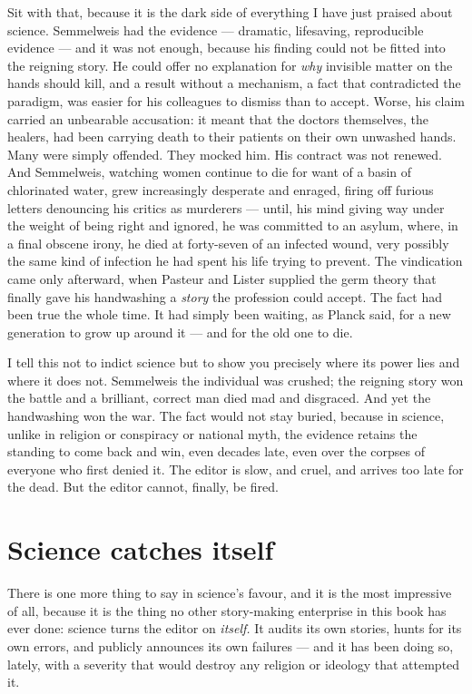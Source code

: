 Sit with that, because it is the dark side of everything I have just praised about science. Semmelweis had the evidence — dramatic, lifesaving, reproducible evidence — and it was not enough, because his finding could not be fitted into the reigning story. He could offer no explanation for \emph{why} invisible matter on the hands should kill, and a result without a mechanism, a fact that contradicted the paradigm, was easier for his colleagues to dismiss than to accept. Worse, his claim carried an unbearable accusation: it meant that the doctors themselves, the healers, had been carrying death to their patients on their own unwashed hands. Many were simply offended. They mocked him. His contract was not renewed. And Semmelweis, watching women continue to die for want of a basin of chlorinated water, grew increasingly desperate and enraged, firing off furious letters denouncing his critics as murderers — until, his mind giving way under the weight of being right and ignored, he was committed to an asylum, where, in a final obscene irony, he died at forty-seven of an infected wound, very possibly the same kind of infection he had spent his life trying to prevent. The vindication came only afterward, when Pasteur and Lister supplied the germ theory that finally gave his handwashing a \emph{story} the profession could accept. The fact had been true the whole time. It had simply been waiting, as Planck said, for a new generation to grow up around it — and for the old one to die.

I tell this not to indict science but to show you precisely where its power lies and where it does not. Semmelweis the individual was crushed; the reigning story won the battle and a brilliant, correct man died mad and disgraced. And yet the handwashing won the war. The fact would not stay buried, because in science, unlike in religion or conspiracy or national myth, the evidence retains the standing to come back and win, even decades late, even over the corpses of everyone who first denied it. The editor is slow, and cruel, and arrives too late for the dead. But the editor cannot, finally, be fired.

\section*{Science catches itself}

There is one more thing to say in science's favour, and it is the most impressive of all, because it is the thing no other story-making enterprise in this book has ever done: science turns the editor on \emph{itself.} It audits its own stories, hunts for its own errors, and publicly announces its own failures — and it has been doing so, lately, with a severity that would destroy any religion or ideology that attempted it.

